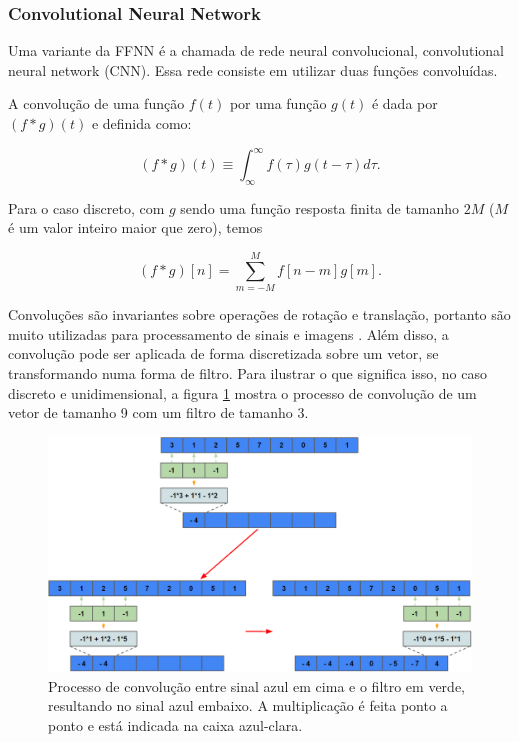 \documentclass[a4paper,12pt,oneside]{book}
\begin{document}
\subsubsection*{Convolutional Neural Network}

\par Uma variante da FFNN é a chamada de rede neural convolucional, convolutional neural network (CNN). Essa rede consiste em utilizar duas funções convoluídas.
\par A convolução de uma função $f(t)$ por uma função $g(t)$ é dada por $(f*g)(t)$ e definida como: 


\begin{equation}\label{eq:conv_cont}
    (f*g)(t) \equiv \int^{\infty}_{\infty} f(\tau)g(t - \tau)d\tau.
\end{equation}

Para o caso discreto, com $g$ sendo uma função resposta finita de tamanho $2M$ ($M$ é um valor inteiro maior que zero), temos

\begin{equation}\label{eq:conv_disc}
    (f*g)[n] = \sum^{M}_{m = -M} f[n - m]g[m]. 
\end{equation}

\par Convoluções são invariantes sobre operações de rotação e translação, portanto são muito utilizadas para processamento de sinais e imagens \cite{signal_book}. Além disso, a convolução pode ser aplicada de forma discretizada sobre um vetor, se transformando numa forma de filtro. Para ilustrar o que significa isso, no caso discreto e unidimensional, a figura \ref{fig:conv_valid} mostra o processo de convolução de um vetor de tamanho 9 com um filtro de tamanho 3.

\begin{figure}[H]
    \centering
    \includegraphics[scale = 0.38]{figs/conv_valid.png}
    \caption{Processo de convolução entre sinal azul em cima e o filtro em verde, resultando no sinal azul embaixo. A multiplicação é feita ponto a ponto e está indicada na caixa azul-clara.}
    \label{fig:conv_valid}
\end{figure}
\end{document}
